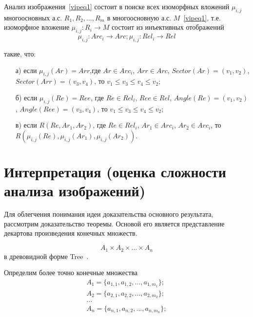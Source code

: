 Анализ изображения~\ref{vipeq1} состоит в поиске всех изоморфных вложений ${ \mu_{i,j} }$ многоосновных а.с. $R_1,R_2,...,R_m$ в многоосновную а.с. $M$~\ref{vipeq1}, т.е. изоморфное вложение $\mu_{i,j} : R_i \rightarrow M$ состоит из инъективных отображений
\begin{equation}
\mu_{i,j} : Arc_i \rightarrow Arc; \mu_{i,j} : Rel_i \rightarrow Rel
\label{vipeq4}
\end{equation}

такие, что:

\begin{enumerate}
\item[а)] если $\mu_{i,j}(Ar) = Arr$,где $Ar \in Arc_i$, $Arr \in Arc$, $Sector(Ar) = (v_1, v_2)$, $Sector(Arr) = (v_3, v_4)$, то $v_1 \le v_3 \le v_4 \le v_2$;
\item[б)] если $\mu_{i,j}(Re) = Ree$, где $Re \in Rel_i$, $Ree \in Rel$, $Angle(Re) = (v_1, v_2)$, $Angle(Ree) = (v_3, v_4)$, то $v_1 \le v_3 \le v_4 \le v_2$;
\item[в)] если $R(Re, Ar_1, Ar_2)$, где $Re \in Rel_i$, $Ar_1 \in Arc_i$, $Ar_2 \in Arc_i$, то $R(\mu_{i,j}(Re), \mu_{i,j}(Ar_1), \mu_{i,j}(Ar_2))$.
\end{enumerate}

\section{Интерпретация (оценка сложности анализа изображений)}
Для облегчения понимания идеи доказательства основного результата, рассмотрим доказательство теоремы. Основой его является представление декартова произведения конечных множеств.

$$A_1 \times A_2 \times \ldots \times A_n$$
в древовидной форме Tree~\cite{1}.

Определим более точно конечные множества 
\begin{equation}
\begin{array}{c}
A_1 = \{a_{1,1}, a_{1,2}, ..., a_{1,m_1}\}; \\
A_2 = \{ a_{2,1}, a_{2,2}, ..., a_{2,m_2}\}; \\
\dots \\
A_n = \{ a_{n,1}, a_{n,2}, ..., a_{n,m_n}\}; \\
\end{array}
\end{equation}


